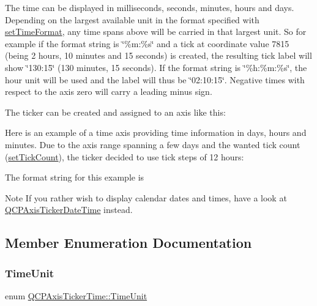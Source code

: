The time can be displayed in milliseconds, seconds, minutes, hours and days. Depending on the largest available unit in the format specified with \mbox{\hyperlink{class_q_c_p_axis_ticker_time_a2f30b6e5125bce4256be9ce3177088ea}{set\+Time\+Format}}, any time spans above will be carried in that largest unit. So for example if the format string is \char`\"{}\%m\+:\%s\char`\"{} and a tick at coordinate value 7815 (being 2 hours, 10 minutes and 15 seconds) is created, the resulting tick label will show \char`\"{}130\+:15\char`\"{} (130 minutes, 15 seconds). If the format string is \char`\"{}\%h\+:\%m\+:\%s\char`\"{}, the hour unit will be used and the label will thus be \char`\"{}02\+:10\+:15\char`\"{}. Negative times with respect to the axis zero will carry a leading minus sign.

The ticker can be created and assigned to an axis like this\+: 
\begin{DoxyCodeInclude}{0}
\end{DoxyCodeInclude}
 Here is an example of a time axis providing time information in days, hours and minutes. Due to the axis range spanning a few days and the wanted tick count (\mbox{\hyperlink{class_q_c_p_axis_ticker_a47752abba8293e6dc18491501ae34008}{set\+Tick\+Count}}), the ticker decided to use tick steps of 12 hours\+:



The format string for this example is 
\begin{DoxyCodeInclude}{0}
\end{DoxyCodeInclude}
 \begin{DoxyNote}{Note}
If you rather wish to display calendar dates and times, have a look at \mbox{\hyperlink{class_q_c_p_axis_ticker_date_time}{Q\+C\+P\+Axis\+Ticker\+Date\+Time}} instead. 
\end{DoxyNote}


\subsection{Member Enumeration Documentation}
\mbox{\label{class_q_c_p_axis_ticker_time_a5c48ded8c6d3a1aca9b68219469fea3e}} 
\subsubsection{\texorpdfstring{TimeUnit}{TimeUnit}}
{\footnotesize\ttfamily enum \mbox{\hyperlink{class_q_c_p_axis_ticker_time_a5c48ded8c6d3a1aca9b68219469fea3e}{Q\+C\+P\+Axis\+Ticker\+Time\+::\+Time\+Unit}}}

